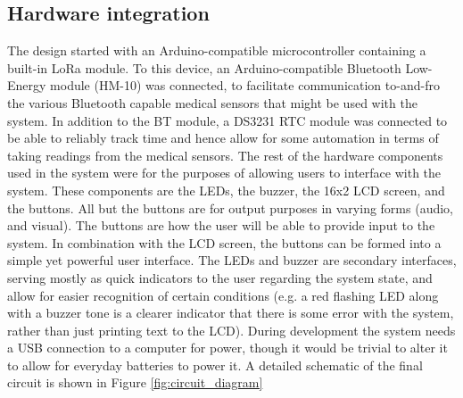 \subsection{Hardware integration}
The design started with an Arduino-compatible microcontroller containing a built-in LoRa module. To this device, an Arduino-compatible Bluetooth Low-Energy module (HM-10) was connected, to facilitate communication to-and-fro the various Bluetooth capable medical sensors that might be used with the system. In addition to the BT module, a DS3231 RTC module was connected to be able to reliably track time and hence allow for some automation in terms of taking readings from the medical sensors. The rest of the hardware components used in the system were for the purposes of allowing users to interface with the system. These components are the LEDs, the buzzer, the 16x2 LCD screen, and the buttons. All but the buttons are for output purposes in varying forms (audio, and visual). The buttons are how the user will be able to provide input to the system. In combination with the LCD screen, the buttons can be formed into a simple yet powerful user interface. The LEDs and buzzer are secondary interfaces, serving mostly as quick indicators to the user regarding the system state, and allow for easier recognition of certain conditions (e.g. a red flashing LED along with a buzzer tone is a clearer indicator that there is some error with the system, rather than just printing text to the LCD). During development the system needs a USB connection to a computer for power, though it would be trivial to alter it to allow for everyday batteries to power it. A detailed schematic of the final circuit is shown in Figure \ref{fig:circuit_diagram}

